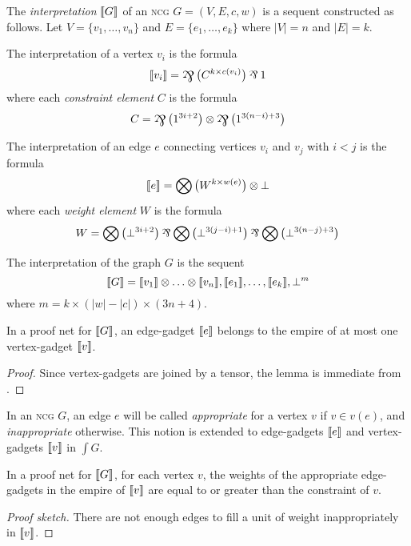 \begin{definition}
The \emph{interpretation} $\llbracket G\rrbracket$ of an \textsc{ncg} $G=(V,E,c,w)$ is a sequent constructed as follows.
%
Let $V=\{v_1,\dotsc,v_n\}$ and $E=\{e_1,\dotsc,e_k\}$ where $|V|=n$ and $|E|=k$.

The interpretation of a vertex $v_i$ is the formula
\[
	\itn{v_i} = \bigparr\big(C^{k\times c(v_i)} \big)\parr 1
\]
where each \emph{constraint element} $C$ is the formula
\[
	C = \bigparr\big(1^{3i+2}\big) \tn \bigparr\big(1^{3(n-i)+3}\big)
\]

The interpretation of an edge $e$ connecting vertices $v_i$ and $v_j$ with $i<j$ is the formula
\[
	\llbracket e\rrbracket = \bigotimes\big(W^{k\times w(e)}\big)\otimes\bot
\]
where each \emph{weight element} $W$ is the formula
\[
	W = \bigotimes\big(\bot^{3i+2}\big)\parr\bigotimes\big(\bot^{3(j-i)+1}\big)\parr\bigotimes\big(\bot^{3(n-j)+3}\big)
\]

The interpretation of the graph $G$ is the sequent
\[
	\llbracket G\rrbracket = \llbracket v_1\rrbracket\otimes\dotso\otimes\llbracket v_n\rrbracket, \llbracket e_1\rrbracket,\dotsc,\llbracket e_k\rrbracket, \bot^m
\]
where $m=k\times(|w|-|c|)\times(3n+4)$.

\end{definition}



\begin{lemma}
In a proof net for $\llbracket G\rrbracket$, an edge-gadget $\llbracket e\rrbracket$ belongs to the empire of at most one vertex-gadget $\llbracket v\rrbracket$.
\end{lemma}

\begin{proof}
Since vertex-gadgets are joined by a tensor, the lemma is immediate from \cite[Proposition 1]{Bellin-vandeWiele-1995}.
\end{proof}


In an \textsc{ncg} $G$, an edge $e$ will be called \emph{appropriate} for a vertex $v$ if $v\in v(e)$, and \emph{inappropriate} otherwise.
%
This notion is extended to edge-gadgets $\llbracket e\rrbracket$ and vertex-gadgets $\llbracket v\rrbracket$ in $\int G$.


\begin{lemma}
\label{lem:appropriate edge weights}
In a proof net for $\llbracket G\rrbracket$, for each vertex $v$, the weights of the appropriate edge-gadgets in the empire of $\llbracket v\rrbracket$ are equal to or greater than the constraint of $v$.
\end{lemma}



\begin{proof}[Proof sketch]
There are not enough edges to fill a unit of weight inappropriately in $\llbracket v\rrbracket$.
\end{proof}


